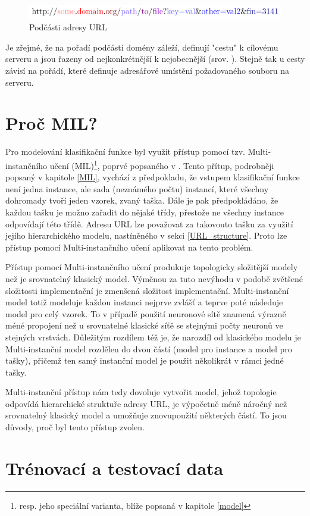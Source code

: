 \begin{figure}[h]
	\caption{Podčásti adresy URL}\label{url_subparts}
	\centering
	\includegraphics{images/url_subparts/url_subparts.pdf}
\end{figure}

Je zřejmé, že na pořadí podčástí domény záleží, definují "cestu" k cílovému serveru a jsou řazeny od nejkonkrétnější k nejobecnější (srov. \cite{mockapetris_domain_1987}).	Stejně tak u cesty závisí na pořádí, které definuje adresářové umístění požadovaného souboru na serveru.

\section{Proč MIL?}

Pro modelování klasifikační funkce byl využit přístup pomocí tzv. Multi-instančního učení (MIL)\footnote{resp. jeho speciální varianta, blíže popsaná v kapitole \ref{model}}, poprvé popsaného v \cite{dietterich_solving_1997}. Tento přítup, podrobněji popsaný v kapitole \ref{MIL}, vychází z předpokladu, že vstupem klasifikační funkce není jedna instance, ale sada (neznámého počtu) instancí, které všechny dohromady tvoří jeden vzorek, zvaný taška. Dále je pak předpokládáno, že každou tašku je možno zařadit do nějaké třídy, přestože ne všechny instance odpovídají této třídě. Adresu URL lze považovat za takovouto tašku za využití jejího hierarchického modelu, nastíněného v sekci \ref{URL_structure}. Proto lze přístup pomocí Multi-instančního učení aplikovat na tento problém.

Přístup pomocí Multi-instančního učení produkuje topologicky složitější modely než je srovnatelný klasický model. Výměnou za tuto nevýhodu v podobě zvětšené složitosti implementační je zmenšená složitost implementační. Multi-instanční model totiž modeluje každou instanci nejprve zvlášť a teprve poté následuje model pro celý vzorek. To v případě použití neuronové sítě znamená výrazně méné propojení než u srovnatelné klasické síťě se stejnými počty neuronů ve stejných vrstvách. Důležitým rozdílem též je, že narozdíl od klasického modelu je Multi-instanční model rozdělen do dvou částí (model pro instance a model pro tašky), přičemž ten samý instanční model je použit několikrát v rámci jedné tašky.

Multi-instanční přístup nám tedy dovoluje vytvořit model, jehož topologie odpovídá hierarchické struktuře adresy URL, je výpočetně méně náročný než srovnatelný klasický model a umožňuje znovupoužití některých částí. To jsou důvody, proč byl tento přístup zvolen.

\section{Trénovací a testovací data}
